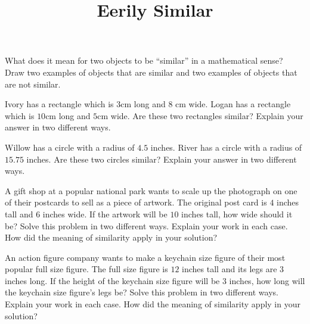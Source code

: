 \documentclass[noauthor,nooutcomes]{ximera}
\title{Eerily Similar}
\begin{document}
\begin{abstract}
\end{abstract}
\maketitle

\begin{problem}
What does it mean for two objects to be ``similar'' in a mathematical sense? Draw two examples of objects that are similar and two examples of objects that are not similar. 
\end{problem}


\begin{problem}
Ivory has a rectangle which is $3$cm long and $8$ cm wide. Logan has a rectangle which is $10$cm long and $5$cm wide. Are these two rectangles similar? Explain your answer in two different ways.
\end{problem}


\begin{problem}
Willow has a circle with a radius of $4.5$ inches. River has a circle with a radius of $15.75$ inches. Are these two circles similar? Explain your answer in two different ways.
\end{problem}



\begin{problem}

A gift shop at a popular national park wants to scale up the photograph on one of their postcards to sell as a piece of artwork. The original post card is $4$ inches tall and $6$ inches wide. If the artwork will be $10$ inches tall, how wide should it be? Solve this problem in two different ways. Explain your work in each case. How did the meaning of similarity apply in your solution?

\end{problem}





\begin{problem}
An action figure company wants to make a keychain size figure of their most popular full size figure. The full size figure is $12$ inches tall and its legs are $3$ inches long. If the height of the keychain size figure will be $3$ inches, how long will the keychain size figure's legs be? Solve this problem in two different ways. Explain your work in each case. How did the meaning of similarity apply in your solution?



\end{problem}
\end{document}
